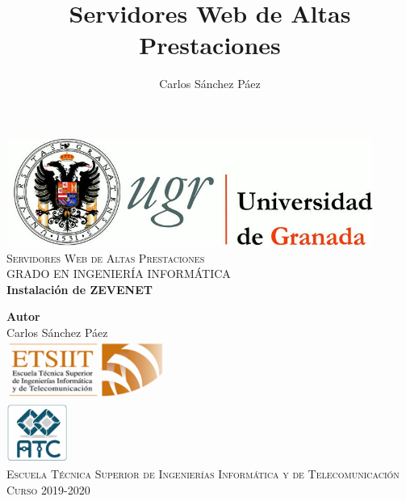 \documentclass[12pt,spanish]{article}
\title{Servidores Web de Altas Prestaciones}
\author{Carlos Sánchez Páez}
\begin{document}
\lstset{columns=fullflexible,basicstyle=\ttfamily}


\begin{titlepage}

 \newlength{\centeroffset}
 \setlength{\centeroffset}{-0.5\oddsidemargin}
 \addtolength{\centeroffset}{0.5\evensidemargin}
 \thispagestyle{empty}

 \noindent\hspace*{\centeroffset}
 \begin{minipage}{\textwidth}

  \centering
  \includegraphics[width=0.9\textwidth]{logo_ugr.jpg}\\[1.4cm]

  \textsc{ \Large Servidores Web de Altas Prestaciones\\[0.2cm]}
  \textsc{GRADO EN INGENIERÍA INFORMÁTICA}\\[1cm]

  {\Huge\bfseries Instalación de ZEVENET \\}
 \end{minipage}

 \vspace{1.5cm}
 \noindent\hspace*{\centeroffset}
 \begin{minipage}{\textwidth}
  \centering

  \textbf{Autor}\\ {Carlos Sánchez Páez}\\[2.5ex]
  \includegraphics[width=0.4\textwidth]{etsiit_logo.png}\\[0.1cm]
  \vspace{1.5cm}
  \includegraphics[width=0.15\textwidth]{atc.jpg}\\[0.1cm]
  \vspace{1cm}
  \textsc{Escuela Técnica Superior de Ingenierías Informática y de Telecomunicación}\\
  \vspace{1cm}
  \textsc{Curso 2019-2020}
 \end{minipage}
\end{titlepage}
\thispagestyle{empty}
\newpage
\tableofcontents{}
\newpage
\end{document}
